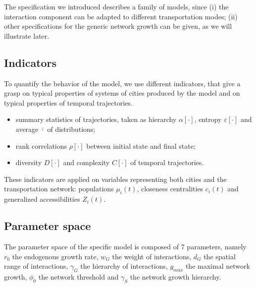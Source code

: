 The specification we introduced describes a family of models, since (i) the interaction component can be adapted to different transportation modes; (ii) other specifications for the generic network growth can be given, as we will illustrate later.


\subsection{Indicators}

To quantify the behavior of the model, we use different indicators, that give a grasp on typical properties of systems of cities produced by the model and on typical properties of temporal trajectories. 
\begin{itemize}
	\item summary statistics of trajectories, taken as hierarchy $\alpha\left[\cdot\right]$, entropy $\varepsilon\left[\cdot\right]$ and average $\bar{\cdot}$ of distributions;
	\item rank correlations $\rho\left[\cdot\right]$ between initial state and final state;
	\item diversity $D\left[\cdot\right]$ and complexity $C\left[\cdot\right]$ of temporal trajectories.
\end{itemize}

These indicators are applied on variables representing both cities and the transportation network: populations $\mu_i(t)$, closeness centralities $c_i (t)$ and generalized accessibilities $Z_i (t)$.


\subsection{Parameter space}

The parameter space of the specific model is composed of 7 parameters, namely $r_0$ the endogenous growth rate, $w_G$ the weight of interactions, $d_G$ the spatial range of interactions, $\gamma_G$ the hierarchy of interactions, $g_{max}$ the maximal network growth, $\phi_0$ the network threshold and $\gamma_S$ the network growth hierarchy. 



